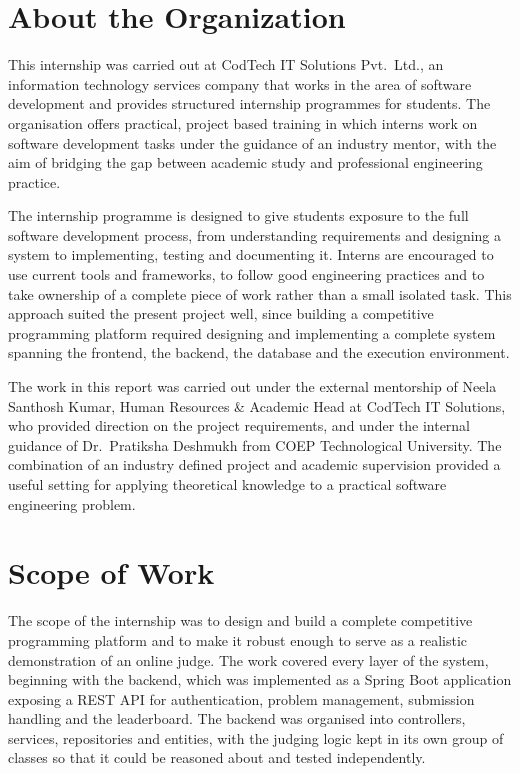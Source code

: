 \documentclass[12pt,a4paper]{report}
\begin{document}
\chapter*{About the Organization}

This internship was carried out at CodTech IT Solutions Pvt.\ Ltd., an information technology services company that works in the area of software development and provides structured internship programmes for students. The organisation offers practical, project based training in which interns work on software development tasks under the guidance of an industry mentor, with the aim of bridging the gap between academic study and professional engineering practice.

The internship programme is designed to give students exposure to the full software development process, from understanding requirements and designing a system to implementing, testing and documenting it. Interns are encouraged to use current tools and frameworks, to follow good engineering practices and to take ownership of a complete piece of work rather than a small isolated task. This approach suited the present project well, since building a competitive programming platform required designing and implementing a complete system spanning the frontend, the backend, the database and the execution environment.

The work in this report was carried out under the external mentorship of Neela Santhosh Kumar, Human Resources \& Academic Head at CodTech IT Solutions, who provided direction on the project requirements, and under the internal guidance of Dr.\ Pratiksha Deshmukh from COEP Technological University. The combination of an industry defined project and academic supervision provided a useful setting for applying theoretical knowledge to a practical software engineering problem.

\chapter*{Scope of Work}

The scope of the internship was to design and build a complete competitive programming platform and to make it robust enough to serve as a realistic demonstration of an online judge. The work covered every layer of the system, beginning with the backend, which was implemented as a Spring Boot application exposing a REST API for authentication, problem management, submission handling and the leaderboard. The backend was organised into controllers, services, repositories and entities, with the judging logic kept in its own group of classes so that it could be reasoned about and tested independently.
\end{document}
